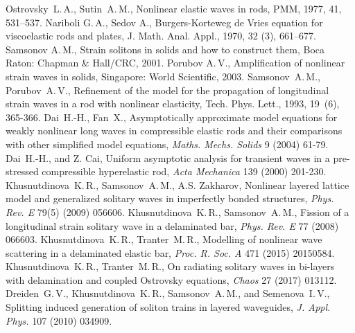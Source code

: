 \documentclass[12pt, a4paper]{article}
\begin{document}
\begin{thebibliography}{99}

	 Ostrovsky~L.\,A., Sutin~A.\,M., Nonlinear elastic waves in rods, PMM, 1977, 41, 531--537.
	 Nariboli G.\,A., Sedov A., Burgers-Korteweg de Vries equation for viscoelastic rods and plates, J. Math. Anal. Appl., 1970, 32 (3), 661--677.
	 Samsonov A.\,M., Strain solitons in solids and how to construct them, Boca Raton: Chapman \& Hall/CRC, 2001.
	 Porubov A.\,V., Amplification of nonlinear strain waves in solids, Singapore: World Scientific, 2003.	
	 Samsonov~A.\,M., Porubov~A.\,V., Refinement of the model for the propagation of longitudinal strain waves in a rod with nonlinear elasticity, Tech. Phys. Lett., 1993, 19~(6), 365-366.
	 Dai~H.-H., Fan~X., Asymptotically approximate model equations for weakly nonlinear long waves in compressible elastic rods and their comparisons with other simplified model equations, \textit{Maths. Mechs. Solids} 9 (2004) 61-79.
	 Dai~H.-H., and Z. Cai, Uniform asymptotic analysis for transient waves in a pre-stressed compressible hyperelastic rod, \textit{Acta Mechanica} 139 (2000) 201-230.
	 Khusnutdinova~K.\,R., Samsonov~A.\,M., A.S. Zakharov, Nonlinear layered lattice model and generalized solitary waves in imperfectly bonded structures, \textit{Phys. Rev. E} 79(5) (2009) 056606.
	 Khusnutdinova~K.\,R., Samsonov~A.\,M., Fission of a longitudinal strain solitary wave in a delaminated bar, \textit{Phys. Rev. E} 77 (2008) 066603.
	 Khusnutdinova~K.\,R., Tranter~M.\,R., Modelling of nonlinear wave scattering in a delaminated elastic bar, \textit{Proc. R. Soc. A} 471 (2015) 20150584.
	 Khusnutdinova~K.\,R., Tranter~M.\,R., On radiating solitary waves in bi-layers with delamination and coupled Ostrovsky equations, \textit{Chaos} 27 (2017) 013112.
	 Dreiden~G.\,V., Khusnutdinova~K.\,R., Samsonov~A.\,M., and Semenova~I.\,V., Splitting induced generation of soliton trains in layered waveguides, \textit{J. Appl. Phys.} 107 (2010) 034909.

\end{thebibliography}
\end{document}
